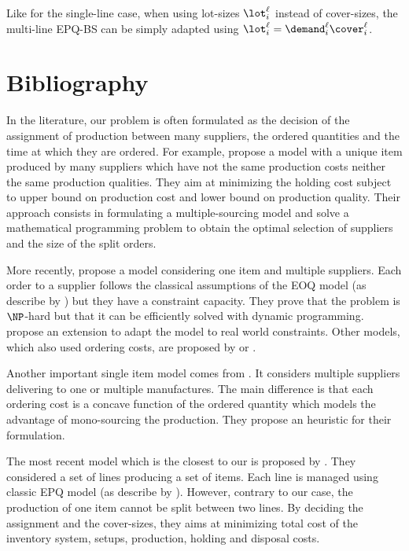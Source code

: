 Like for the single-line case, when using lot-sizes $\lot_i^{\ell}$ instead of cover-sizes, the multi-line EPQ-BS can be simply adapted using $\lot_i^{\ell}=\demand_i^{\ell}\cover_i^{\ell}$.



\section{Bibliography}



In the literature, our problem is often formulated as the decision of the assignment of production between many suppliers, the ordered quantities and the time at which they are ordered.
For example, \citet{Hong1992} propose a model with a unique item produced by many suppliers which have not the same production costs neither the same production qualities.
They aim at minimizing the holding cost subject to upper bound on production cost and lower bound on production quality.
Their approach consists in formulating a multiple-sourcing model and solve a mathematical programming problem to obtain the optimal selection of suppliers and the size of the split orders.


More recently, \citet{Rosenblatt1998} propose a model considering one item and multiple suppliers.
Each order to a supplier follows the classical assumptions of the EOQ model (as describe by \citet{Harris1914}) but they have a constraint capacity.
They prove that the problem is $\NP$-hard but that it can be efficiently solved with dynamic programming.
\citet{Chang2006} propose an extension to adapt the model to real world constraints.
Other models, which also used ordering costs, are proposed by \citet{Kim2005} or \citet{Park2006}.


Another important single item model comes from \citet{Chauhan2003}.
It considers multiple suppliers delivering to one or multiple manufactures.
The main difference is that each ordering cost is a concave function of the ordered quantity which models the advantage of mono-sourcing the production.
They propose an heuristic for their formulation.


The most recent model which is the closest to our is proposed by \citet{Nobil2016}.
They considered a set of lines producing a set of items.
Each line is managed using classic EPQ model (as describe by \citet{Taft1918}).
However, contrary to our case, the production of one item cannot be split between two lines.
By deciding the assignment and the cover-sizes, they aims at minimizing total cost of the inventory system, setups, production, holding and disposal costs.





